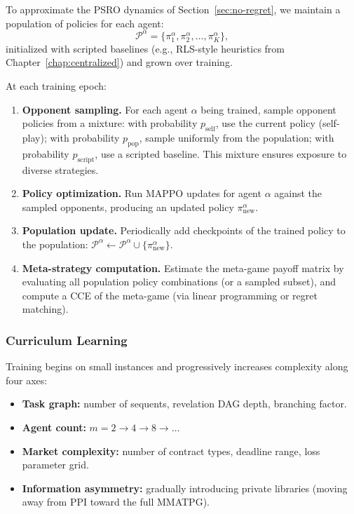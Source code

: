 To approximate the PSRO dynamics of Section~\ref{sec:no-regret}, we maintain a population of policies for each agent:
\[
\mathcal{P}^\alpha = \{\pi^\alpha_1, \pi^\alpha_2, \ldots, \pi^\alpha_K\},
\]
initialized with scripted baselines (e.g., RLS-style heuristics from Chapter~\ref{chap:centralized}) and grown over training.

At each training epoch:
\begin{enumerate}
    \item \textbf{Opponent sampling.} For each agent $\alpha$ being trained, sample opponent policies from a mixture: with probability $p_{\mathrm{self}}$, use the current policy (self-play); with probability $p_{\mathrm{pop}}$, sample uniformly from the population; with probability $p_{\mathrm{script}}$, use a scripted baseline. This mixture ensures exposure to diverse strategies.
    
    \item \textbf{Policy optimization.} Run MAPPO updates for agent $\alpha$ against the sampled opponents, producing an updated policy $\pi^\alpha_{\mathrm{new}}$.
    
    \item \textbf{Population update.} Periodically add checkpoints of the trained policy to the population: $\mathcal{P}^\alpha \leftarrow \mathcal{P}^\alpha \cup \{\pi^\alpha_{\mathrm{new}}\}$.
    
    \item \textbf{Meta-strategy computation.} Estimate the meta-game payoff matrix by evaluating all population policy combinations (or a sampled subset), and compute a CCE of the meta-game (via linear programming or regret matching).
\end{enumerate}


\subsubsection{Curriculum Learning}

Training begins on small instances and progressively increases complexity along four axes:
\begin{itemize}
    \item \textbf{Task graph:} number of sequents, revelation DAG depth, branching factor.
    \item \textbf{Agent count:} $m = 2 \to 4 \to 8 \to \ldots$
    \item \textbf{Market complexity:} number of contract types, deadline range, loss parameter grid.
    \item \textbf{Information asymmetry:} gradually introducing private libraries (moving away from PPI toward the full MMATPG).
\end{itemize}

